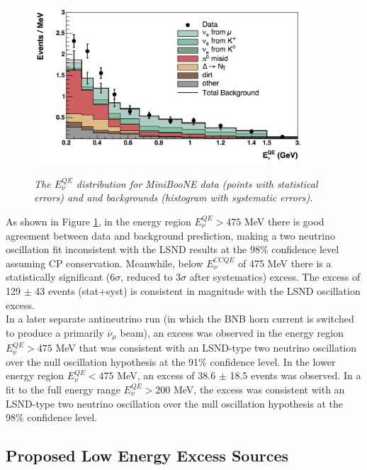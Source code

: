 \begin{figure}[ht!]
\centering
	\includegraphics[width=0.9\textwidth]{Figures/MB_published_stackedhisto.png} \\
\caption{\textit{The $E_\nu^{QE}$ distribution for MiniBooNE data (points with statistical errors) and and backgrounds (histogram with systematic errors).}}\label{MB_published_stackedhisto_fig}
\end{figure}


As shown in Figure \ref{MB_published_stackedhisto_fig}, in the energy region $E_\nu^{QE} > 475$ MeV there is good agreement between data and background prediction, making a two neutrino oscillation fit inconsistent with the LSND results at the 98\% confidence level assuming CP conservation. Meanwhile, below $E_\nu^{CCQE}$ of 475 MeV there is a statistically significant (6$\sigma$, reduced to 3$\sigma$ after systematics) excess. The excess of 129 $\pm$ 43 events (stat+syst) is consistent in magnitude with the LSND oscillation excess.\\


In a later separate antineutrino run (in which the BNB horn current is switched to produce a primarily $\overline{\nu}_\mu$ beam), an excess was observed in the energy region $E_\nu^{QE} > 475$ MeV that was consistent with an LSND-type two neutrino oscillation over the null oscillation hypothesis at the 91\% confidence level. In the lower energy region $E_\nu^{QE} < 475$ MeV, an excess of 38.6 $\pm$ 18.5 events was observed. In a fit to the full energy range $E_\nu^{QE} > 200$ MeV, the excess was consistent with an LSND-type two neutrino oscillation over the null oscillation hypothesis at the 98\% confidence level.\\


\subsection{Proposed Low Energy Excess Sources}

